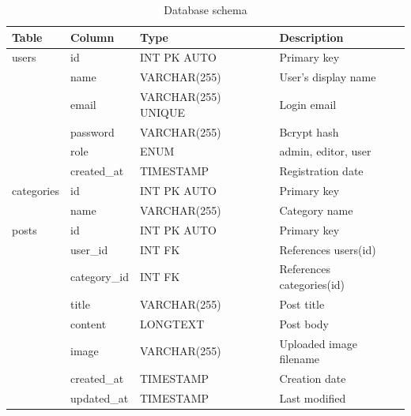 \documentclass[12pt,a4paper]{report}
\begin{document}
\begin{table}[h]
\centering
\begin{tabular}{l l l l}
\toprule
\textbf{Table} & \textbf{Column} & \textbf{Type} & \textbf{Description} \\
\midrule
users & id & INT PK AUTO & Primary key \\
      & name & VARCHAR(255) & User's display name \\
      & email & VARCHAR(255) UNIQUE & Login email \\
      & password & VARCHAR(255) & Bcrypt hash \\
      & role & ENUM & admin, editor, user \\
      & created\_at & TIMESTAMP & Registration date \\
\midrule
categories & id & INT PK AUTO & Primary key \\
           & name & VARCHAR(255) & Category name \\
\midrule
posts & id & INT PK AUTO & Primary key \\
      & user\_id & INT FK & References users(id) \\
      & category\_id & INT FK & References categories(id) \\
      & title & VARCHAR(255) & Post title \\
      & content & LONGTEXT & Post body \\
      & image & VARCHAR(255) & Uploaded image filename \\
      & created\_at & TIMESTAMP & Creation date \\
      & updated\_at & TIMESTAMP & Last modified \\
\bottomrule
\end{tabular}
\caption{Database schema}
\end{table}
\end{document}
